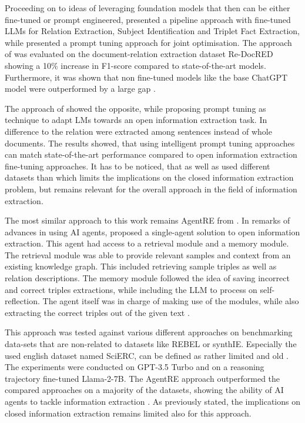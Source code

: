 \documentclass[a4paper,oneside,bibliography=totoc]{scrbook}
\begin{document}
Proceeding on to ideas of leveraging foundation models that then can be either fine-tuned or prompt engineered, \citet{Xue2024} presented a pipeline approach with fine-tuned \acp{LLM} for Relation Extraction, Subject Identification and Triplet Fact Extraction, while \citet{Chen2024} presented a prompt tuning approach for joint optimisation. The approach of \citet{Xue2024} was evaluated on the document-relation extraction dataset Re-DocRED showing a 10\% increase in F1-score compared to state-of-the-art models. Furthermore, it was shown that non fine-tuned models like the base ChatGPT model were outperformed by a large gap \cite{Xue2024}.

The approach of \citet{Chen2024} showed the opposite, while proposing prompt tuning as technique to adapt \acp{LM} towards an open information extraction task. In difference to \citet{Xue2024} the relation were extracted among sentences instead of whole documents. The results showed, that using intelligent prompt tuning approaches can match state-of-the-art performance compared to open information extraction fine-tuning approaches. It has to be noticed, that \citet{Chen2024} as well as \cite{Xue2024} used different datasets than \citet{Josifoski2023} which limits the implications on the closed information extraction problem, but remains relevant for the overall approach in the field of information extraction.

The most similar approach to this work remains AgentRE from \citet{Shi2024}. In remarks of advances in using \ac{AI} agents, \citet{Shi2024} proposed a single-agent solution to open information extraction. This agent had access to a retrieval module and a memory module. The retrieval module was able to provide relevant samples and context from an existing knowledge graph. This included retrieving sample triples as well as relation descriptions. The memory module followed the idea of saving incorrect and correct triples extractions, while including the \ac{LLM} to process on self-reflection. The agent itself was in charge of making use of the modules, while also extracting the correct triples out of the given text \cite{Shi2024}.

This approach was tested against various different approaches on benchmarking data-sets that are non-related to datasets like REBEL or synthIE. Especially the used english dataset named SciERC, can be defined as rather limited and old \cite{Luan2018}. The experiments were conducted on GPT-3.5 Turbo and on a reasoning trajectory fine-tuned Llama-2-7B. The AgentRE approach outperformed the compared approaches on a majority of the datasets, showing the ability of \ac{AI} agents to tackle information extraction \cite{Shi2024}. As previously stated, the implications on closed information extraction remains limited also for this approach.
\end{document}
